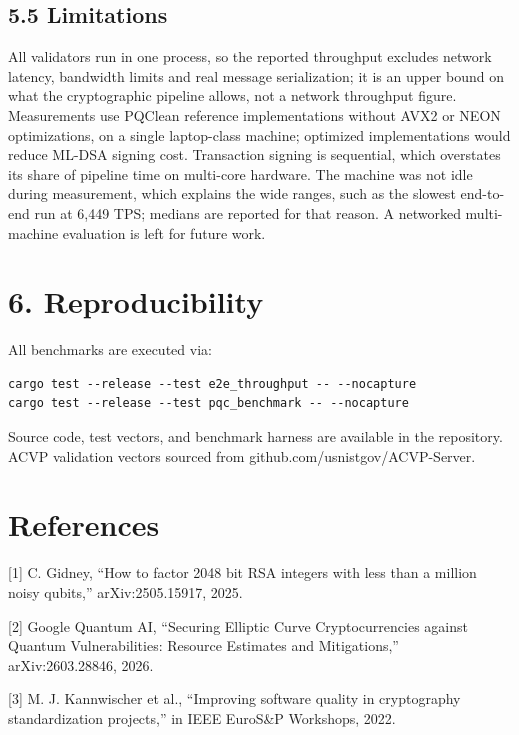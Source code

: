 \documentclass[
]{article}
\begin{document}
\subsection{5.5 Limitations}\label{limitations}

All validators run in one process, so the reported throughput excludes
network latency, bandwidth limits and real message serialization; it is
an upper bound on what the cryptographic pipeline allows, not a network
throughput figure. Measurements use PQClean reference implementations
without AVX2 or NEON optimizations, on a single laptop-class machine;
optimized implementations would reduce ML-DSA signing cost. Transaction
signing is sequential, which overstates its share of pipeline time on
multi-core hardware. The machine was not idle during measurement, which
explains the wide ranges, such as the slowest end-to-end run at 6,449
TPS; medians are reported for that reason. A networked multi-machine
evaluation is left for future work.

\section{6. Reproducibility}\label{reproducibility}

All benchmarks are executed via:

\begin{verbatim}
cargo test --release --test e2e_throughput -- --nocapture
cargo test --release --test pqc_benchmark -- --nocapture
\end{verbatim}

Source code, test vectors, and benchmark harness are available in the
repository. ACVP validation vectors sourced from
github.com/usnistgov/ACVP-Server.

\section{References}\label{references}

{[}1{]} C. Gidney, ``How to factor 2048 bit RSA integers with less than
a million noisy qubits,'' arXiv:2505.15917, 2025.

{[}2{]} Google Quantum AI, ``Securing Elliptic Curve Cryptocurrencies
against Quantum Vulnerabilities: Resource Estimates and Mitigations,''
arXiv:2603.28846, 2026.

{[}3{]} M. J. Kannwischer et al., ``Improving software quality in
cryptography standardization projects,'' in IEEE EuroS\&P Workshops,
2022.
\end{document}
